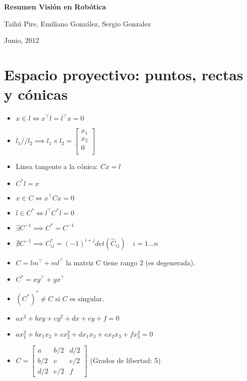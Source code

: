 \documentclass[12pt,a4paper]{article}
\begin{document}
\begin{center}
{\bf Resumen Visi\'on en Rob\'otica}

\medskip
Taih\'u Pire, Emiliano Gonz\'alez, Sergio Gonzalez

Junio, 2012
\end{center}


\setlength{\parindent}{0pt} %

\section{Espacio proyectivo: puntos, rectas y c\'onicas}

\begin{itemize}
	\item $x \in l \Longleftrightarrow x^{\top}l = l^{\top} x = 0$

	\item $l_{1} // l_{2} \implies l_{1} \times l_{2} = \left[ {\begin{smallmatrix}
	 x_{1}\\
	 x_{2}\\
	 0\\
	\end{smallmatrix} } \right]
	$

	\item Linea tangente a la c\'onica: $C x = l$

	\item $C^{*} l = x$

	\item $x \in C \Longleftrightarrow x^{\top} C x = 0$


	\item $l \in C^{*} \Longleftrightarrow l^{\top} C^{*} l = 0$

	\item $ \exists C^{-1} \implies C^{*} = C^{-1}$

	\item $ \nexists C^{-1} \implies C_{ij}^{*} = (-1)^{i+j} det(\hat{C}_{ij}) \quad i=1\dots n$

	\item $C = lm^{\top}+ml^{\top}$ la matriz C tiene rango 2 (es degenerada).

	\item $C^{*} = xy^{\top}+yx^{\top}$

	\item $(C^{*})^{*}  \neq C$ si $C$ es singular.

	\item $ax^{2}+bxy+cy^{2}+dx+ey+f = 0$

	\item $ax_{1}^{2}+bx_{1}x_{2}+cx_{2}^{2}+dx_{1}x_{3}+ex_{2}x_{3}+fx_{3}^{2} = 0$


	\item $
	C =
	\left[ {\begin{smallmatrix}
	 a & b/2 & d/2 \\
	 b/2 & c & e/2 \\
	 d/2 & e/2 & f
	\end{smallmatrix} } \right]
	$ (Grados de libertad: 5)
\end{itemize}
\end{document}
